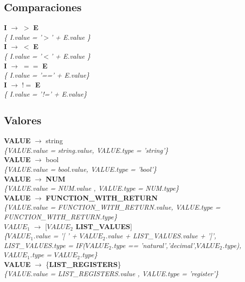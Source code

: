 \documentclass[10pt,a4paper]{article}
\begin{document}
\subsection{Comparaciones}
\textbf{I} $\rightarrow$ $>$ \textbf{E} \\
\textit{\{ I.value = '$>$' + E.value  \}} \\

\textbf{I} $\rightarrow$ $<$ \textbf{E}\\
\textit{\{ I.value = '$<$' + E.value  \}} \\

\textbf{I} $\rightarrow$ $==$ \textbf{E}\\
\textit{\{ I.value =  '==' + E.value\}} \\

\textbf{I} $\rightarrow$ $!=$ \textbf{E}\\
\textit{\{ I.value =  '!=' + E.value\}} \\

\subsection{Valores}
\textbf{VALUE} $\rightarrow$ string \\
\textit{\{VALUE.value = string.value, VALUE.type = 'string'\}} \\

\textbf{VALUE} $\rightarrow$ bool   \\
\textit{\{VALUE.value = bool.value, VALUE.type = 'bool'\}} \\

\textbf{VALUE} $\rightarrow$ \textbf{NUM}   \\
\textit{\{VALUE.value =  NUM.value , VALUE.type =  NUM.type\}} \\

\textbf{VALUE} $\rightarrow$ \textbf{FUNCTION\_WITH\_RETURN} \\
\textit{\{VALUE.value =  FUNCTION\_WITH\_RETURN.value, VALUE.type = FUNCTION\_WITH\_RETURN.type\}} \\

\textbf{$VALUE_1$} $\rightarrow$ [\textbf{$VALUE_2$ LIST\_VALUES}]   \\
\textit{\{$VALUE_1$.value =  '[ ' + $VALUE_2$.value + LIST\_VALUES.value + ']', LIST\_VALUES.type = IF($VALUE_2$.type == 'natural','decimal',$VALUE_2$.type), $VALUE_1$.type = $VALUE_2$.type\}} \\

\textbf{VALUE} $\rightarrow$ \{\textbf{LIST\_REGISTERS}\} \\
\textit{\{VALUE.value =  LIST\_REGISTERS.value , VALUE.type = 'register'\}} \\
\end{document}
